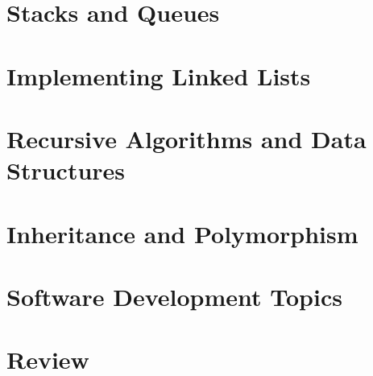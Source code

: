 \chapter{Stacks and Queues}
\label{chap:StacksAndQueues}
\lipsum[1]

\chapter{Implementing Linked Lists}
\label{chap:ImplementingLinkedLists}
\lipsum[1]

\chapter{Recursive Algorithms and Data Structures}
\label{chap:RecursiveAlgorithmsAndDataStructures}
\lipsum[1]

\chapter{Inheritance and Polymorphism}
\label{chap:InheritanceAndPolymorphism}
\lipsum[1]

\chapter{Software Development Topics}
\label{chap:SoftwareDevelopmentTopics}
\lipsum[1]

\chapter{Review}
\label{chap:Review}
\lipsum[1]

